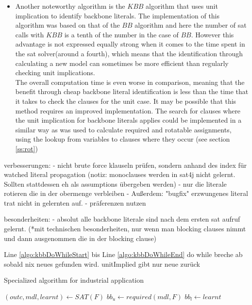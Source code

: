 \begin{itemize}
\item Another noteworthy algorithm is the $KBB$ algorithm that uses unit implication to identify backbone literals. The implementation of this algorithm was based on that of the $BB$ algorithm and here the number of sat calls with $KBB$ is a tenth of the number in the case of $BB$. However this advantage is not expressed equally strong when it comes to the time spent in the sat solver(around a fourth), which means that the identification through calculating a new model can sometimes be more efficient than regularly checking unit implications.\\
The overall computation time is even worse in comparison, meaning that the benefit through cheap backbone literal identification is less than the time that it takes to check the clauses for the unit case. It may be possible that this method requires an improved implementation. The search for clauses where the unit implication for backbone literals applies could be implemented in a similar way as was used to calculate required and rotatable assignments, using the lookup from variables to clauses where they occur (see section \ref{ss:rot})
\end{itemize}

verbesserungen:
- nicht brute force klauseln prüfen, sondern anhand des index für watched literal propagation (notiz: monoclauses werden in sat4j nicht gelernt. Sollten stattdessen eh als assumptions übergeben werden)
- nur die literale rotieren die in der obermenge verbleiben
- Außerdem: "bugfix" erzwungenes literal trat nicht in gelernten auf.
- präferenzen nutzen

besonderheiten: 
- absolut alle backbone literale sind nach dem ersten sat aufruf gelernt. (*mit technischen besonderheiten, nur wenn man blocking clauses nimmt und dann ausgenommen die in der blocking clause)

Line \ref{algo:kbbDoWhileStart} bis Line \ref{algo:kbbDoWhileEnd} do while breche ab sobald nix neues gefunden wird. unitImplied gibt nur neue zurück


\begin{algorithm}
\caption{{\sc Specialized algorithm for industrial application}}
\DontPrintSemicolon
{}
$(outc,mdl,learnt) \gets SAT(F)$\;
$bb_u \gets required(mdl,F)$\;
$bb_l \gets learnt$\;
\label{alg:thoreSpecial}
\end{algorithm}

